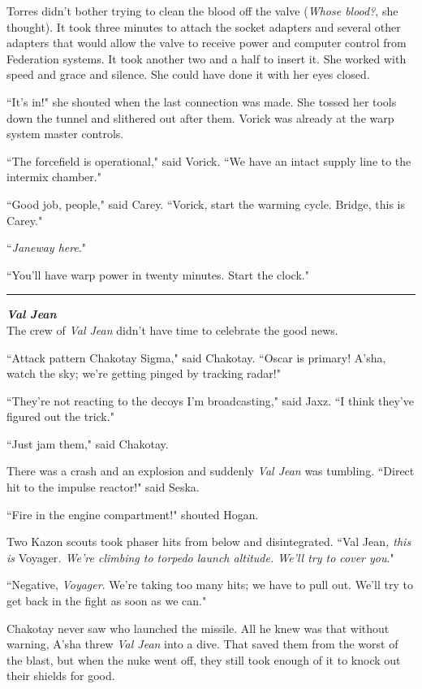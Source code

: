 \documentclass[twoside,letterpaper,12pt]{memoir}
\begin{document}
Torres didn't bother trying to clean the blood off the valve (\textit{Whose blood?}, she thought). It took three minutes to attach the socket adapters and several other adapters that would allow the valve to receive power and computer control from Federation systems. It took another two and a half to insert it. She worked with speed and grace and silence. She could have done it with her eyes closed.

``It's in!" she shouted when the last connection was made. She tossed her tools down the tunnel and slithered out after them. Vorick was already at the warp system master controls.

``The forcefield is operational," said Vorick. ``We have an intact supply line to the intermix chamber."

``Good job, people," said Carey. ``Vorick, start the warming cycle. Bridge, this is Carey."

``\textit{Janeway here}."

``You'll have warp power in twenty minutes. Start the clock."

\begin{center}\rule{3cm}{0.4 pt}\end{center}

\noindent\textit{\textbf{Val Jean}}\\

The crew of \textit{Val Jean} didn't have time to celebrate the good news.

``Attack pattern Chakotay Sigma," said Chakotay. ``Oscar is primary! A'sha, watch the sky; we're getting pinged by tracking radar!"

``They're not reacting to the decoys I'm broadcasting," said Jaxz. ``I think they've figured out the trick."

``Just jam them," said Chakotay.

There was a crash and an explosion and suddenly \textit{Val Jean} was tumbling. ``Direct hit to the impulse reactor!" said Seska.

``Fire in the engine compartment!" shouted Hogan.

Two Kazon scouts took phaser hits from below and disintegrated. ``Val Jean\textit{, this is }Voyager\textit{. We're climbing to torpedo launch altitude. We'll try to cover you}."

``Negative, \textit{Voyager}. We're taking too many hits; we have to pull out. We'll try to get back in the fight as soon as we can."

Chakotay never saw who launched the missile. All he knew was that without warning, A'sha threw \textit{Val Jean} into a dive. That saved them from the worst of the blast, but when the nuke went off, they still took enough of it to knock out their shields for good.
\end{document}
